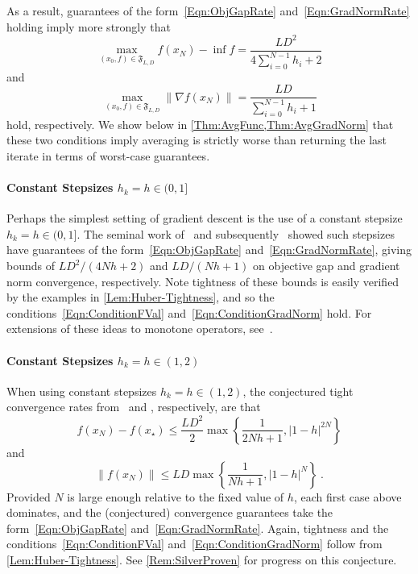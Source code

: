 \documentclass[11pt]{article}
\numberwithin{equation}{section}
\theoremstyle{definition}
\theoremstyle{definition}
\theoremstyle{definition}
\newcommand{\1}{\mathbf{1}}
\newcommand{\xStar}{x_\star}
\newcommand{\sumH}[1]{\sum_{i=0}^{#1} h_i}
\begin{document}
As a result, guarantees of the form~\eqref{Eqn:ObjGapRate} and~\eqref{Eqn:GradNormRate} holding imply more strongly that
\begin{equation} \label{Eqn:ConditionFVal}
    \max_{(x_0,f)\in \mathfrak{F}_{L,D}} f(x_N) - \inf f = \frac{LD^2}{4\sumH{N-1} + 2} \tag{C1}
\end{equation}
and
\begin{equation}\label{Eqn:ConditionGradNorm}
    \max_{(x_0,f)\in \mathfrak{F}_{L,D}} \| \nabla f(x_N) \| = \frac{LD}{\sumH{N-1}+1} \tag{C2}
\end{equation}
hold, respectively. We show below in \cref{Thm:AvgFunc,Thm:AvgGradNorm} that these two conditions imply averaging is strictly worse than returning the last iterate in terms of worst-case guarantees.

\paragraph{Constant Stepsizes $h_k = h \in (0,1]$} Perhaps the simplest setting of gradient descent is the use of a constant stepsize $h_k=h\in (0,1]$. The seminal work of~\cite{FirstPEP} and subsequently~\cite{Teboulle_4T_Analytical} showed such stepsizes have guarantees of the form~\eqref{Eqn:ObjGapRate} and~\eqref{Eqn:GradNormRate}, giving bounds of $LD^2/(4Nh + 2)$ and $LD/(Nh+1)$ on objective gap and gradient norm convergence, respectively. Note tightness of these bounds is easily verified by the examples in \cref{Lem:Huber-Tightness}, and so the conditions~\eqref{Eqn:ConditionFVal} and~\eqref{Eqn:ConditionGradNorm} hold. For extensions of these ideas to monotone operators, see~\cite[Remark 4.10]{LiederThesis}.

\paragraph{Constant Stepsizes $h_k = h \in (1,2)$}
When using constant stepsizes $h_k = h \in (1,2)$, the conjectured tight convergence rates from~\cite[Conjecture 3.1]{FirstPEP} and \cite[Conjecture 3]{Interpolation}, respectively, are that
\begin{equation}\label{Eqn:LargeHBound}
    f(x_N) - f(\xStar) \leq \frac{LD^2}{2} \max\left\{\frac{1}{2Nh+1}, |1-h|^{2N}\right\}
\end{equation}
and
\begin{equation}\label{Eqn:LargeHBoundGrad}
    \|f(x_N) \| \leq LD \max \left\{\frac{1}{Nh+1}, |1-h|^N\right\} \ .
\end{equation}
Provided $N$ is large enough relative to the fixed value of $h$, each first case above dominates, and the (conjectured) convergence guarantees take the form~\eqref{Eqn:ObjGapRate} and~\eqref{Eqn:GradNormRate}. Again, tightness and the conditions~\eqref{Eqn:ConditionFVal} and~\eqref{Eqn:ConditionGradNorm} follow from \cref{Lem:Huber-Tightness}. See \cref{Rem:SilverProven} for progress on this conjecture.
\end{document}
